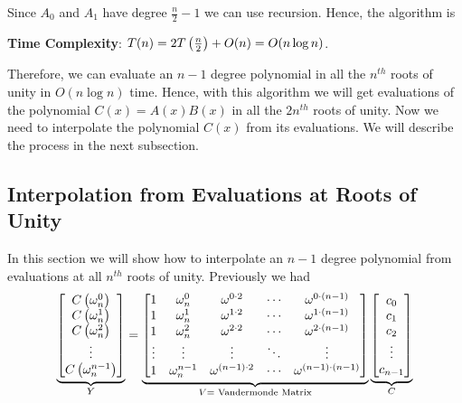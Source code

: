 \vspace*{5mm}\parinf
Since $A_0$ and $A_1$ have degree $\frac{n}2-1$ we can use recursion. Hence, the algorithm is
\begin{algorithm}
	\DontPrintSemicolon
	\caption{$(A)$}
\end{algorithm}

\textbf{Time Complexity}: $T(n)=2T\left(\frac{n}2\right)+O(n)=O(n\log n)$.\parinn

Therefore, we can evaluate an $n-1$ degree polynomial in all the $n^{th}$ roots of unity in $O(n\log n)$ time. Hence, with this algorithm we will get evaluations of the polynomial $C(x)=A(x)B(x)$ in all the $2n^{th}$ roots of unity. Now we need to interpolate the polynomial $C(x)$ from its evaluations. We will describe the process in the next subsection.
\subsection{Interpolation from Evaluations at Roots of Unity}
In this section we will show how to interpolate an $n-1$ degree polynomial from evaluations at all $n^{th}$ roots of unity. Previously we had $$\underbrace{\left[\begin{matrix}C\left(\omega^0_n\right)\\ C\left(\omega^1_n\right)\\ C\left(\omega^2_n\right)\\ \vdots\\ C\left(\omega^{n-1}_n\right)\end{matrix}\right]}_{Y}=\underbrace{\left[\begin{matrix}1 & \omega^0_n & \omega ^{0\cdot 2}& \cdots & \omega^{0\cdot (n-1)}\\  1 & \omega^1_n & \omega ^{1\cdot 2}& \cdots & \omega^{1\cdot (n-1)}\\ 1 & \omega^2_n & \omega ^{2\cdot 2}& \cdots & \omega^{2\cdot (n-1)}\\ \vdots & \vdots & \vdots & \ddots & \vdots\\ 1 & \omega^{n-1}_n & \omega ^{(n-1)\cdot 2}& \cdots & \omega^{(n-1)\cdot (n-1)}\end{matrix}\right]}_{V=\text{ Vandermonde Matrix}}\underbrace{\left[\begin{matrix}c_0\\ c_1\\ c_2\\ \vdots \\ c_{n-1}\end{matrix}\right]}_{C}$$

